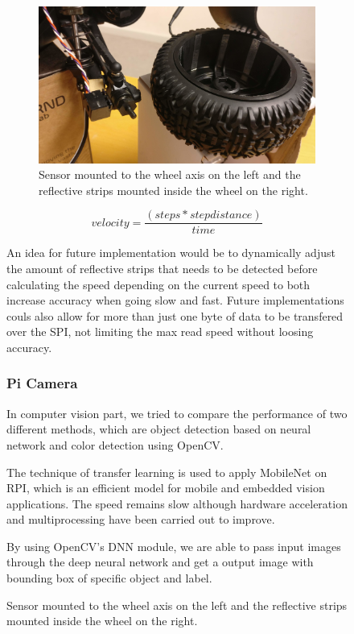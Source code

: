 \documentclass[11pt, titlepage]{article} %
\begin{document}
\begin{figure}
\begin{figure}[]
	\centering
   	\includegraphics[scale=0.5]{speedometer.jpg}
   	\caption{Sensor mounted to the wheel axis on the left and the reflective strips mounted inside the wheel on the right.}
    \label{fig:speedometer}
\end{figure}

\begin{equation}
    velocity = \frac{(steps*stepdistance)}{time}
    \label{eq:velocity}
\end{equation}

An idea for future implementation would be to dynamically adjust the amount of reflective strips that needs to be detected before calculating the speed depending on the current speed to both increase accuracy when going slow and fast. Future implementations couls also allow for more than just one byte of data to be transfered over the SPI, not limiting the max read speed without loosing accuracy.

\subsubsection{Pi Camera}
In computer vision part, we tried to compare the performance of two different methods, which are object detection based on neural network and color detection using OpenCV.

The technique of transfer learning is used to apply MobileNet on RPI, which is an efficient model for mobile and embedded vision applications. The speed remains slow although hardware acceleration and multiprocessing have been carried out to improve.

By using OpenCV’s DNN module, we are able to pass input images through the deep neural network and get a output image with bounding box of specific object and label.


\end{figure}
\end{document}
